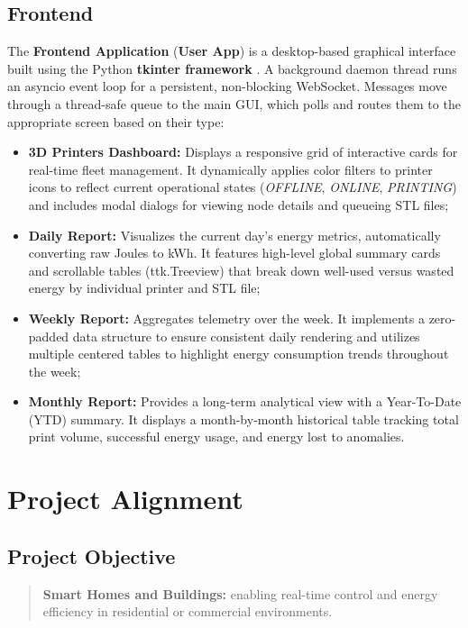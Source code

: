 \subsection{Frontend}
The \textbf{Frontend Application} (\textbf{User App}) is a desktop-based graphical interface built using the Python \textbf{tkinter framework} \cite{tkinter}. A background daemon thread runs an asyncio event loop for a persistent, non-blocking WebSocket. Messages move through a thread-safe queue to the main GUI, which polls and routes them to the appropriate screen based on their type:
\begin{itemize}
	\item \textbf{3D Printers Dashboard:} Displays a responsive grid of interactive cards for real-time fleet management. It dynamically applies color filters to printer icons to reflect current operational states (\textit{OFFLINE}, \textit{ONLINE}, \textit{PRINTING}) and includes modal dialogs for viewing node details and queueing STL files;
	\item \textbf{Daily Report:} Visualizes the current day's energy metrics, automatically converting raw Joules to kWh. It features high-level global summary cards and scrollable tables (ttk.Treeview) that break down well-used versus wasted energy by individual printer and STL file;
	\item \textbf{Weekly Report:} Aggregates telemetry over the week. It implements a zero-padded data structure to ensure consistent daily rendering and utilizes multiple centered tables to highlight energy consumption trends throughout the week;
	\item \textbf{Monthly Report:} Provides a long-term analytical view with a Year-To-Date (YTD) summary. It displays a month-by-month historical table tracking total print volume, successful energy usage, and energy lost to anomalies.
\end{itemize}

\newpage

\section{Project Alignment}
\subsection{Project Objective}
\begin{quote}
	\textbf{Smart Homes and Buildings:} enabling real-time control and energy efficiency in residential or commercial environments.
\end{quote}

